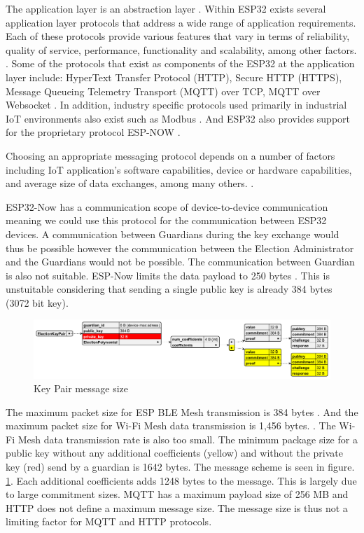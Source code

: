 The application layer is an abstraction layer \cite[3]{protocols}. Within ESP32 exists several application layer protocols that address a wide range of application requirements.  Each of these protocols provide various features that vary in terms of reliability, quality of service, performance, functionality and scalability, among other factors. \cite[3]{protocols}. Some of the protocols that exist as components of the ESP32 at the application layer include: HyperText Transfer Protocol (HTTP), Secure HTTP (HTTPS), Message Queueing Telemetry Transport (MQTT) over TCP, MQTT over Websocket \cite{esp-prog}. In addition, industry specific protocols used primarily in industrial IoT environments also exist such as Modbus \cite[3]{protocols}. And ESP32 also provides support for the proprietary protocol ESP-NOW \cite{esp-prog}.

Choosing an appropriate messaging protocol depends on a number of factors including IoT application's software capabilities, device or hardware capabilities, and average size of data exchanges, among many others. \cite[2]{protocols}.

ESP32-Now has a communication scope of device-to-device communication meaning we could use this protocol for the communication between ESP32 devices. A communication between Guardians during the key exchange would thus be possible however the communication between the Election Administrator and the Guardians would not be possible. The communication between Guardian is also not suitable. ESP-Now limits the data payload to 250 bytes \cite{esp-prog}. This is unstuitable considering that sending a single public key is already 384 bytes (3072 bit key).

\begin{figure}
    \centering
    \includegraphics[width=1\textwidth]{abbildungen/Diagramme/mElectionKeyPair.png}
    \caption{Key Pair message size}
    \label{Fig:keypair-size}
\end{figure}

The maximum packet size for ESP BLE Mesh transmission is 384 bytes \cite{esp-faq}. And the maximum packet size for Wi-Fi Mesh data transmission is 1,456 bytes. \cite{esp-faq}. The Wi-Fi Mesh data transmission rate is also too small. The minimum package size for a public key without any additional coefficients (yellow) and without the private key (red) send by a guardian is 1642 bytes. The message scheme is seen in figure. \ref{Fig:keypair-size}. Each additional coefficients adds 1248 bytes to the message. This is largely due to large commitment sizes. MQTT has a maximum payload size of 256 MB and HTTP does not define a maximum message size. The message size is thus not a limiting factor for MQTT and HTTP protocols.


